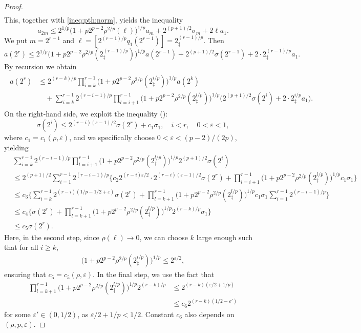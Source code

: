 \documentclass[11pt,a4,leqno]{amsart}
\newcommand{\vep}{\varepsilon}
\newcommand{\1}{{\mathbf 1}}
\begin{document}
\begin{proof}
\begin{align*}
\end{align*}
This, together with \eqref{ineq:pth:norm}, yields the inequality 
\[
 a_{2m} \le 2^{1/p} \big(1+p 2^{p-2} \rho^{2/p}(\ell)\big)^{1/p} a_m + 2^{(p+1)/2} \sigma_m + 2\ell a_1. 
\]
We put $m=2^{r-1}$ and $\ell =[2^{(r-1)/p} q_1(2^{r-1})]= 2^{(r-1)/p}_\ddag$. 
Then 
\[
 a(2^r) \le 2^{1/p} \big(1+p 2^{p-2} \rho^{2/p} (2_\ddag^{(r-1)/p})\big)^{1/p}
a(2^{r-1}) + 2^{(p+1)/2}\sigma(2^{r-1}) + 2\cdot 2_\ddag^{(r-1)/p} a_1. 
\]
By recursion we obtain 
\begin{align}
\label{ineq:pf:lemma:4th}
\begin{split}
 a(2^r) &\le 2^{(r-k)/p} \prod_{i=k}^{r-1} \big(1+p2^{p-2} \rho^{2/p}(2_\ddag^{i/p})\big)^{1/p} a(2^k) \\
& \quad + \sum_{i=k}^{r-1} 2^{(r-i-1)/p} \prod_{l=i+1}^{r-1} \big(1+p2^{p-2} \rho^{2/p}(2_\ddag^{l/p})\big)^{1/p}
\Big(2^{(p+1)/2}\sigma(2^{i})+2\cdot 2_\ddag^{i/p} a_1 \Big).
\end{split} 
\end{align}
On the right-hand side, we exploit the inequality (\cite[Lemma 2]{peligrad:1987}): 
\[
\sigma(2^i) \le 2^{(r-i)(\vep -1)/2} \sigma(2^r) + c_1 \sigma_1,\quad  i<r,\quad 0<\vep<1, 
\]
where $c_1=c_1(\rho,\vep)$, and we specifically choose $0<\vep< (p-2)/(2p)$, yielding 
\begin{align*}
& \sum_{i=k}^{r-1} 2^{(r-i-1)/p} \prod_{l=i+1}^{r-1}
\big(1+p2^{p-2} \rho^{2/p}(2_\ddag^{l/p})\big)^{1/p} 2^{(p+1)/2} \sigma(2^i) \\
& \le 2^{(p+1)/2} \sum_{i=1}^{r-1} 2^{(r-i-1)/p} \Big\{
c_2 2^{(r-i)\vep /2}\cdot 2^{(r-i)(\vep-1)/2}\sigma(2^r)+ \prod_{l=i+1}^{r-1}
\big(1+p 2^{p-2} \rho^{2/p}(2^{l/p}_\ddag )\big)^{1/p} c_1 \sigma_1
\Big\} \\
& \le c_3 \bigg\{ \sum_{i=k}^{r-1} 2^{(r-i)(1/p-1/2+\vep)}\sigma(2^r) + \prod_{l=k+1}^{r-1}
\big(
1+p 2^{p-2} \rho^{2/p}(2^{l/p}_\ddag)
\big)^{1/p} c_1 \sigma_1 \sum_{i=1}^{r-1} 2^{(r-i-1)/p} \bigg\} \\
& \le c_4 \bigg\{
\sigma(2^r)+ \prod_{l=k+1}^{r-1} \big(
1+p 2^{p-2} \rho^{2/p}(2^{l/p}_\ddag)
\big)^{1/p} 2^{(r-k)/p}\sigma_1 
\bigg\} \\
& \le c_5 \sigma(2^r).
\end{align*}
Here, in the second step, since $\rho(\ell) \to 0$, we can choose $k$ large enough such that for all $i\ge k$,  
\begin{align}
\label{ineq:product:rho}
 \big(1+ p2^{p-2} \rho^{2/p}(2^{i/p}_\ddag )\big)^{1/p} \le 2^{\vep/2}, 
\end{align}
ensuring that $c_5=c_5(\rho,\vep)$. In the final step, we use the fact that 
\begin{align*}
 \prod_{l=k+1}^{r-1}\big(1+ p2^{p-2} \rho^{2/p}(2^{l/p}_\ddag ) \big)^{1/p}
2^{(r-k)/p} &\le 2^{(r-k)(\vep/2+1/p)} \\
& \le c_6 2^{(r-k)(1/2-\vep')}  
\end{align*} 
for some $\vep'\in (0,1/2)$, as $\vep/2 + 1/p < 1/2$. Constant $c_6$ also depends on $(\rho,p,\vep)$. 


\end{proof}
\end{document}
